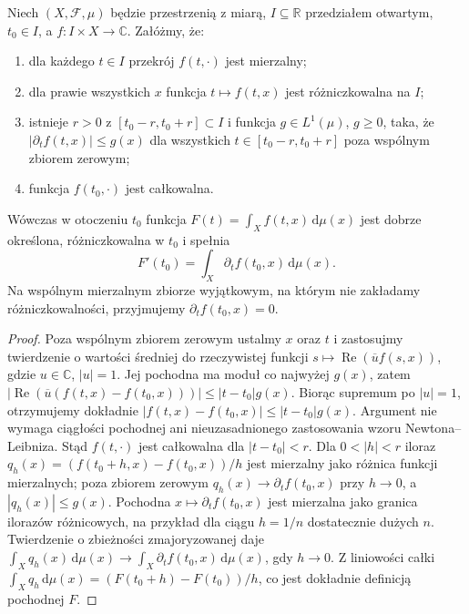 \begin{twierdzenie}
\label{thm:local-differentiation-11}
Niech $(X,\mathcal F,\mu)$ będzie przestrzenią z miarą,
$I\subseteq\mathbb R$ przedziałem otwartym,
$t_0\in I$, a $f:I\times X\to\mathbb C$. Załóżmy, że:
\begin{enumerate}[label=\textup{(\roman*)}]
\item dla każdego $t\in I$ przekrój $f(t,\cdot)$ jest mierzalny;
\item dla prawie wszystkich $x$ funkcja $t\mapsto f(t,x)$ jest
      różniczkowalna na $I$;
\item istnieje $r>0$ z $[t_0-r,t_0+r]\subset I$ i funkcja
      $g\in L^1(\mu)$, $g\ge0$, taka, że
      $|\partial_t f(t,x)|\le g(x)$ dla wszystkich
      $t\in[t_0-r,t_0+r]$ poza wspólnym zbiorem zerowym;
\item funkcja $f(t_0,\cdot)$ jest całkowalna.
\end{enumerate}
Wówczas w otoczeniu $t_0$ funkcja
$F(t)=\int_Xf(t,x)\,\mathrm d\mu(x)$ jest dobrze określona,
różniczkowalna w $t_0$ i spełnia
\begin{equation}\label{eq:diff-param-11}
F'(t_0)=\int_X\partial_t f(t_0,x)\,\mathrm d\mu(x).
\end{equation}
Na wspólnym mierzalnym zbiorze wyjątkowym, na którym
nie zakładamy różniczkowalności, przyjmujemy
$\partial_t f(t_0,x)=0$.
\end{twierdzenie}
\begin{proof}
Poza wspólnym zbiorem zerowym ustalmy $x$ oraz $t$
i zastosujmy twierdzenie o wartości średniej do
rzeczywistej funkcji
$s\mapsto\operatorname{Re}(\overline{u}f(s,x))$,
gdzie $u\in\mathbb C$, $|u|=1$. Jej pochodna
ma moduł co najwyżej $g(x)$, zatem
$|\operatorname{Re}(\overline{u}(f(t,x)-f(t_0,x)))|
\le |t-t_0|g(x)$. Biorąc supremum po
$|u|=1$, otrzymujemy dokładnie
$|f(t,x)-f(t_0,x)|\le |t-t_0|g(x)$.
Argument nie wymaga ciągłości pochodnej ani
nieuzasadnionego zastosowania wzoru Newtona--Leibniza.
Stąd $f(t,\cdot)$ jest całkowalna dla $|t-t_0|<r$.
Dla $0<|h|<r$ iloraz
$q_h(x)=(f(t_0+h,x)-f(t_0,x))/h$ jest mierzalny
jako różnica funkcji mierzalnych; poza zbiorem zerowym
$q_h(x)\to\partial_tf(t_0,x)$ przy $h\to0$,
a $|q_h(x)|\le g(x)$. Pochodna $x\mapsto\partial_tf(t_0,x)$
jest mierzalna jako granica ilorazów różnicowych, na przykład
dla ciągu $h=1/n$ dostatecznie dużych $n$.
Twierdzenie o zbieżności zmajoryzowanej daje
$\int_Xq_h(x)\,\mathrm d\mu(x)\to
\int_X\partial_tf(t_0,x)\,\mathrm d\mu(x)$,
gdy $h\to0$. Z liniowości całki
$\int_Xq_h\,\mathrm d\mu(x)=(F(t_0+h)-F(t_0))/h$,
co jest dokładnie definicją pochodnej $F$.
\end{proof}

